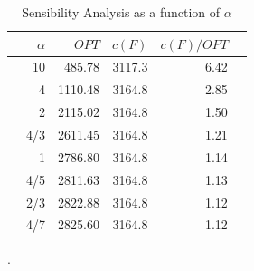 \documentclass{endm}
\begin{document}
\begin{table}[H]
\caption{Sensibility Analysis as a function of $\alpha$ \label{Table:resul1}}
\centering
\begin{tabular}{l|r|r|r|r|r}
\toprule
& $\alpha$  & $OPT$ & $c(F)$ & $c(F)/OPT$\\
\midrule
&   10 & 485.78 & 3117.3  & 6.42  \\
&   4 & 1110.48 & 3164.8  & 2.85  \\
&   2 & 2115.02 & 3164.8  & 1.50   \\
&   4/3 & 2611.45 & 3164.8  & 1.21 \\
&   1 & 2786.80  & 3164.8  & 1.14   \\
&   4/5 & 2811.63  & 3164.8  & 1.13 \\
&   2/3 & 2822.88  & 3164.8   & 1.12 \\
&   4/7 & 2825.60  & 3164.8  & 1.12  \\
\bottomrule
\end{tabular}
\end{table}
.

\clearpage
\end{document}
